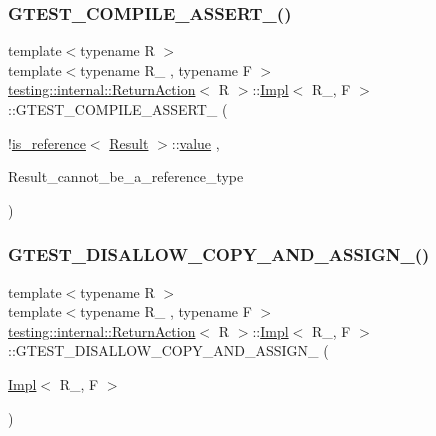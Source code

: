 \subsubsection{\texorpdfstring{GTEST\_COMPILE\_ASSERT\_()}{GTEST\_COMPILE\_ASSERT\_()}\hspace{0.1cm}{\footnotesize\ttfamily [3/3]}}
{\footnotesize\ttfamily template$<$typename R $>$ \\
template$<$typename R\+\_\+ , typename F $>$ \\
\mbox{\hyperlink{classtesting_1_1internal_1_1_return_action}{testing\+::internal\+::\+Return\+Action}}$<$ R $>$\+::\mbox{\hyperlink{classtesting_1_1internal_1_1_return_action_1_1_impl}{Impl}}$<$ R\+\_\+, F $>$\+::G\+T\+E\+S\+T\+\_\+\+C\+O\+M\+P\+I\+L\+E\+\_\+\+A\+S\+S\+E\+R\+T\+\_\+ (\begin{DoxyParamCaption}\item[{!\mbox{\hyperlink{structtesting_1_1internal_1_1is__reference}{is\+\_\+reference}}$<$ \mbox{\hyperlink{classtesting_1_1_action_interface_a7477de2fe3e4e01c59db698203acaee7}{Result}} $>$\+::\mbox{\hyperlink{_obj__test_2lib_2googletest-master_2googlemock_2test_2gmock-matchers__test_8cc_a337b8a670efc0b086ad3af163f3121b6}{value}}}]{,  }\item[{Result\+\_\+cannot\+\_\+be\+\_\+a\+\_\+reference\+\_\+type}]{ }\end{DoxyParamCaption})\hspace{0.3cm}{\ttfamily [private]}}

\mbox{\label{classtesting_1_1internal_1_1_return_action_1_1_impl_abc88338b2f0a633f71eccacb81d03fba}} 
\subsubsection{\texorpdfstring{GTEST\_DISALLOW\_COPY\_AND\_ASSIGN\_()}{GTEST\_DISALLOW\_COPY\_AND\_ASSIGN\_()}\hspace{0.1cm}{\footnotesize\ttfamily [1/3]}}
{\footnotesize\ttfamily template$<$typename R $>$ \\
template$<$typename R\+\_\+ , typename F $>$ \\
\mbox{\hyperlink{classtesting_1_1internal_1_1_return_action}{testing\+::internal\+::\+Return\+Action}}$<$ R $>$\+::\mbox{\hyperlink{classtesting_1_1internal_1_1_return_action_1_1_impl}{Impl}}$<$ R\+\_\+, F $>$\+::G\+T\+E\+S\+T\+\_\+\+D\+I\+S\+A\+L\+L\+O\+W\+\_\+\+C\+O\+P\+Y\+\_\+\+A\+N\+D\+\_\+\+A\+S\+S\+I\+G\+N\+\_\+ (\begin{DoxyParamCaption}\item[{\mbox{\hyperlink{classtesting_1_1internal_1_1_return_action_1_1_impl}{Impl}}$<$ R\+\_\+, F $>$}]{ }\end{DoxyParamCaption})\hspace{0.3cm}{\ttfamily [private]}}


